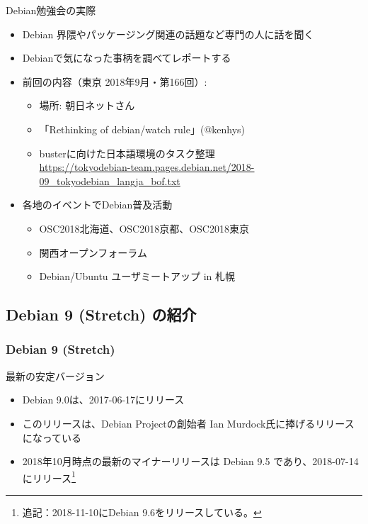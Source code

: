 \documentclass[mingoth,a4paper]{jsarticle}
\begin{document}
Debian勉強会の実際
\begin{itemize}
  \item Debian 界隈やパッケージング関連の話題など専門の人に話を聞く
  \item Debianで気になった事柄を調べてレポートする
  \item 前回の内容（東京 2018年9月・第166回）:
	\begin{itemize}
	\item 場所: 朝日ネットさん
    \item 「Rethinking of debian/watch rule」(@kenhys)
    \item busterに向けた日本語環境のタスク整理 \\
      \url{https://tokyodebian-team.pages.debian.net/2018-09_tokyodebian_langja_bof.txt}
	\end{itemize}
  \item 各地のイベントでDebian普及活動
	\begin{itemize}
      \item OSC2018北海道、OSC2018京都、OSC2018東京
      \item 関西オープンフォーラム
	  \item Debian/Ubuntu ユーザミートアップ in 札幌
	\end{itemize}
 \end{itemize}


\subsection{Debian 9 (Stretch) の紹介}

\subsubsection{Debian 9 (Stretch)}

最新の安定バージョン
\begin{itemize}
  \item Debian 9.0は、2017-06-17にリリース
  \item このリリースは、Debian Projectの創始者 Ian Murdock氏に捧げるリリースになっている

  \item 2018年10月時点の最新のマイナーリリースは Debian 9.5 であり、2018-07-14にリリース\footnote{追記：2018-11-10にDebian 9.6をリリースしている。}
\end{itemize}
\end{document}
